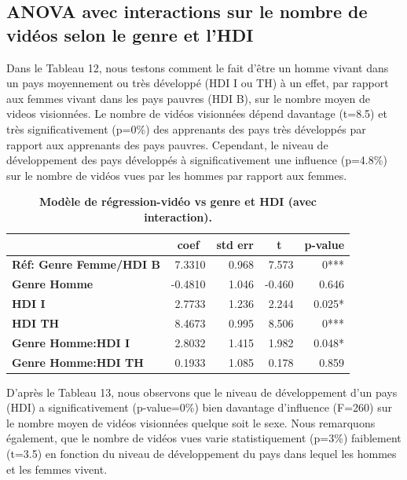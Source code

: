 \documentclass[12pt, a4paper, titlepage, table]{article}
\begin{document}
	\subsection{ANOVA avec interactions sur le nombre de vidéos selon le genre et l'HDI}	
	Dans le Tableau 12, nous testons comment le fait d'être un homme vivant dans un pays moyennement ou très développé (HDI I ou TH) à un effet, par rapport 
	aux femmes vivant dans les pays pauvres (HDI B), sur le nombre moyen de videos visionnées. 
	Le nombre de vidéos visionnées dépend davantage (t=8.5) et très significativement (p=0\%) des apprenants des pays très développés par rapport aux apprenants des pays pauvres.  
	Cependant, le niveau de développement des pays développés à significativement une influence (p=4.8\%) sur le nombre de vidéos vues par les hommes par rapport aux femmes.  
	
	\begin{table}[H]
		\centering
		\fontsize{12}{20}\selectfont
		\begin{tabular}{|l|r|r|r|r|}
			\hline
			\multicolumn{1}{|c|}{\textbf{}}&
			\multicolumn{1}{c|}{\textbf{coef}}&
			\multicolumn{1}{c|}{\textbf{std err}}&
			\multicolumn{1}{c|}{\textbf{t}}&
			\multicolumn{1}{c|}{\textbf{p-value}}\\	
			\hline
				\textbf{Réf: Genre Femme/HDI B}&			7.3310&			0.968&	7.573&	0***\\
				\textbf{Genre Homme}&	-0.4810&		1.046&	-0.460&	0.646\\	
				\textbf{HDI I}&	2.7733&			1.236&	2.244&	0.025*\\	
				\textbf{HDI TH}&	8.4673&			0.995&	8.506&	0***\\	
				\textbf{Genre Homme:HDI I}&	2.8032&	1.415&	1.982&	0.048*\\
				\textbf{Genre Homme:HDI TH}&	0.1933&	1.085&	0.178&	0.859\\
			\hline
		\end{tabular}
	\caption{\textbf{Modèle de régression-vidéo vs genre et HDI (avec interaction).}}
\end{table}
	
	D'après le Tableau 13, nous observons que le niveau de développement d'un pays (HDI) a significativement (p-value=0\%) bien davantage d'influence (F=260) sur le nombre moyen de vidéos 
	visionnées quelque soit le sexe. Nous remarquons également, que le nombre de vidéos vues varie statistiquement (p=3\%) faiblement (t=3.5) en fonction  
	du niveau de développement du pays dans lequel les hommes et les femmes vivent. 
	
\end{document}
